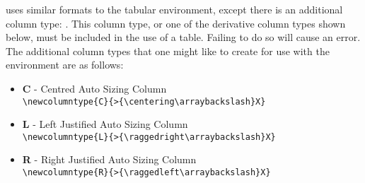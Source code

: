 		 uses similar formats to the tabular environment, except there is an additional column type: .
		This column type, or one of the derivative column types shown below, must be included in the use of a  table. 
		Failing to do so will cause an error. The additional column types that one might like to create for use with the  environment are as follows:
		\begin{itemize}
			\item \textbf{C} - Centred Auto Sizing Column\\\lstinline|\newcolumntype{C}{>{\centering\arraybackslash}X}|
			\item \textbf{L} - Left Justified Auto Sizing Column \\\lstinline|\newcolumntype{L}{>{\raggedright\arraybackslash}X}|
			\item \textbf{R} - Right Justified Auto Sizing Column \\\lstinline|\newcolumntype{R}{>{\raggedleft\arraybackslash}X}|
		\end{itemize}
  
